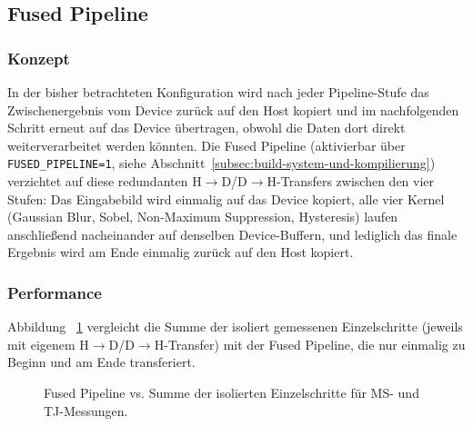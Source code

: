 \subsection{Fused Pipeline}
\label{sec:results_fused}

\subsubsection{Konzept}
In der bisher betrachteten Konfiguration wird nach jeder Pipeline-Stufe
das Zwischenergebnis vom Device zurück auf den Host kopiert und im
nachfolgenden Schritt erneut auf das Device übertragen, obwohl die
Daten dort direkt weiterverarbeitet werden könnten. Die Fused Pipeline
(aktivierbar über \texttt{FUSED\_PIPELINE=1}, siehe
Abschnitt~\ref{subsec:build-system-und-kompilierung}) verzichtet auf diese
redundanten H$\to$D/D$\to$H-Transfers zwischen den vier Stufen: Das
Eingabebild wird einmalig auf das Device kopiert, alle vier Kernel
(Gaussian Blur, Sobel, Non-Maximum Suppression, Hysteresis) laufen
anschließend nacheinander auf denselben Device-Buffern, und lediglich
das finale Ergebnis wird am Ende einmalig zurück auf den Host kopiert.

\subsubsection{Performance}
Abbildung ~\ref{fig:fused_comparison_combined} vergleicht die Summe der isoliert gemessenen
Einzelschritte (jeweils mit eigenem H$\to$D/D$\to$H-Transfer) mit der
Fused Pipeline, die nur einmalig zu Beginn und am Ende transferiert.

\begin{figure}[H]
    \centering
    \caption{Fused Pipeline vs. Summe der isolierten Einzelschritte für MS- und TJ-Messungen.}
    \label{fig:fused_comparison_combined}
\end{figure}


